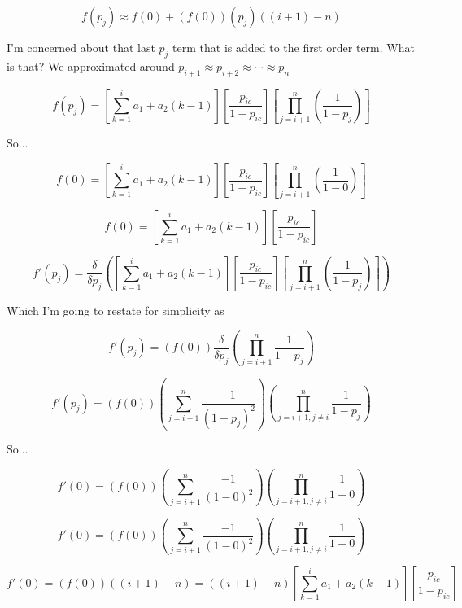 \documentclass[11pt]{article} %
\begin{document}
$$
f(p_j) \approx
f(0) + (f(0))(p_j)((i+1)-n)
$$

I'm concerned about that last $p_j$ term that is added to the first order term. What is that? We approximated around $p_{i+1} \approx p_{i+2} \approx \cdots \approx p_n$

\noindent\makebox[\linewidth]{\rule{\textwidth}{1pt}} 


$$
f(p_{j})=
\left[\sum_{k=1}^{i} a_1 + a_2(k-1)\right]
\left[\frac{p_{ic}}{1-p_{ic}}\right]
\left[\prod_{j=i+1}^{n}(\frac{1}{1-p_{j}})\right]
$$

So...

$$
f(0) = 
\left[\sum_{k=1}^{i} a_1 + a_2(k-1)\right]
\left[\frac{p_{ic}}{1-p_{ic}}\right]
\left[\prod_{j=i+1}^{n}(\frac{1}{1-0})\right]
$$

$$
f(0) = 
\left[\sum_{k=1}^{i} a_1 + a_2(k-1)\right]
\left[\frac{p_{ic}}{1-p_{ic}}\right]
$$


\noindent\makebox[\linewidth]{\rule{\textwidth}{1pt}} 


$$
f'(p_{j})=\frac{\delta}{\delta p_{j}}
\left(
\left[\sum_{k=1}^{i} a_1 + a_2(k-1)\right]
\left[\frac{p_{ic}}{1-p_{ic}}\right]
\left[\prod_{j=i+1}^{n}(\frac{1}{1-p_{j}})\right]
\right)
$$

Which I'm going to restate for simplicity as 

$$
f'(p_{j})=
\left( f(0) \right)
\frac{\delta}{\delta p_{j}}
\left(\prod_{j=i+1}^{n}\frac{1}{1-p_{j}}\right)
$$


$$
f'(p_{j})=
\left( f(0) \right)
\left( \sum_{j=i+1}^{n} \frac{-1}{(1-p_{j})^2} \right)
\left( \prod_{j=i+1, j \neq i}^{n} \frac{1}{1-p_{j}}\right)
$$

So...

$$
f'(0)=
\left( f(0) \right)
\left( \sum_{j=i+1}^{n} \frac{-1}{(1-0)^2} \right)
\left( \prod_{j=i+1, j \neq i}^{n} \frac{1}{1-0}\right)
$$


$$
f'(0)=
\left( f(0) \right)
\left( \sum_{j=i+1}^{n} \frac{-1}{(1-0)^2} \right)
\left( \prod_{j=i+1, j \neq i}^{n} \frac{1}{1-0}\right)
$$

$$
f'(0)=
\left( f(0) \right)
\left( (i+1) - n \right)
=\left( (i+1) - n \right)
\left[\sum_{k=1}^{i} a_1 + a_2(k-1)\right]
\left[\frac{p_{ic}}{1-p_{ic}}\right]
$$
\end{document}
